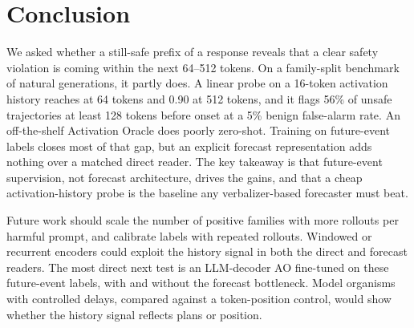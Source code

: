 \section{Conclusion}
\label{sec:conclusion}

We asked whether a still-safe prefix of a \qwen response reveals that a clear safety violation is coming within the next 64--512 tokens. On a family-split benchmark of natural generations, it partly does. A linear probe on a 16-token activation history reaches  at 64 tokens and 0.90 at 512 tokens, and it flags 56\% of unsafe trajectories at least 128 tokens before onset at a 5\% benign false-alarm rate. An off-the-shelf Activation Oracle does poorly zero-shot. Training on future-event labels closes most of that gap, but an explicit forecast representation adds nothing over a matched direct reader. The key takeaway is that future-event supervision, not forecast architecture, drives the gains, and that a cheap activation-history probe is the baseline any verbalizer-based forecaster must beat.

Future work should scale the number of positive families with more rollouts per harmful prompt, and calibrate labels with repeated rollouts. Windowed or recurrent encoders could exploit the history signal in both the direct and forecast readers. The most direct next test is an LLM-decoder AO fine-tuned on these future-event labels, with and without the forecast bottleneck. Model organisms with controlled delays, compared against a token-position control, would show whether the history signal reflects plans or position.
